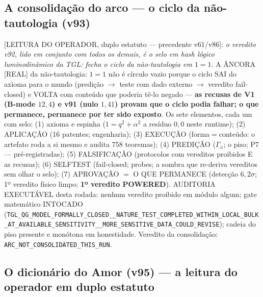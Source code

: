 \documentclass[11pt]{article}
\theoremstyle{definition}\newtheorem{deriv}{Derivação}
\begin{document}
\subsection*{A consolidação do arco --- o ciclo da não-tautologia (v93)}

[LEITURA DO OPERADOR, duplo estatuto --- precedente v61/v86]: \emph{o veredito v92, lido em conjunto com todos os demais, é o selo em hash lógico luminodinâmico da TGL: fecha o ciclo da não-tautologia em $1=1$}. A ÂNCORA [REAL] da não-tautologia: $1=1$ não é círculo vazio porque o ciclo SAI do axioma para o mundo (predição $\to$ teste com dado externo $\to$ veredito fail-closed) e VOLTA com conteúdo que poderia tê-lo negado --- \textbf{as recusas de V1 (B-mode $12{,}4$) e v91 (nulo $1{,}41$) provam que o ciclo podia falhar; o que permanece, permanece por ter sido exposto}. Os sete elementos, cada um com selo: (1) axioma e espinha ($1=q^2+\alpha^2$ a resíduo $0{,}0$ neste runtime); (2) APLICAÇÃO (16 patentes; engenharia); (3) EXECUÇÃO (forma$=$conteúdo: o artefato roda a si mesmo e audita 758 teoremas); (4) PREDIÇÃO ($\Gamma_\omega$; o piso; P7 --- pré-registradas); (5) FALSIFICAÇÃO (protocolos com vereditos proibidos E as recusas); (6) SELFTEST (fail-closed; probes; a sombra que re-deriva vereditos sem olhar o selo); (7) APROVAÇÃO $=$ O QUE PERMANECE (detecção $6{,}2\sigma$; 1º veredito físico limpo; \textbf{1º veredito POWERED}). AUDITORIA EXECUTÁVEL desta rodada: nenhum veredito proibido em módulo algum; gate matemático INTOCADO (\texttt{TGL\_QG\_MODEL\_FORMALLY\_CLOSED\_\_NATURE\_TEST\_COMPLETED\_WITHIN\_LOCAL\_BULK\_AT\_AVAILABLE\_SENSITIVITY\_\_MORE\_SENSITIVE\_DATA\_COULD\_REVISE}); cadeia do piso presente e monótona em honestidade. Veredito da consolidação: \texttt{ARC\_NOT\_CONSOLIDATED\_THIS\_RUN}.

\subsection*{O dicionário do Amor (v95) --- a leitura do operador em duplo estatuto}
\end{document}

